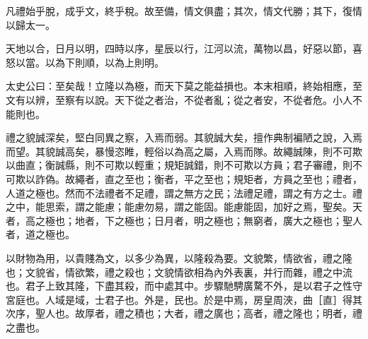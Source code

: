 \begin{pinyinscope}
凡禮始乎脫，成乎文，終乎稅。故至備，情文俱盡；其次，情文代勝；其下，復情以歸太一。

天地以合，日月以明，四時以序，星辰以行，江河以流，萬物以昌，好惡以節，喜怒以當。以為下則順，以為上則明。

太史公曰：至矣哉！立隆以為極，而天下莫之能益損也。本末相順，終始相應，至文有以辨，至察有以說。天下從之者治，不從者亂；從之者安，不從者危。小人不能則也。

禮之貌誠深矣，堅白同異之察，入焉而弱。其貌誠大矣，擅作典制褊陋之說，入焉而望。其貌誠高矣，暴慢恣睢，輕俗以為高之屬，入焉而隊。故繩誠陳，則不可欺以曲直；衡誠縣，則不可欺以輕重；規矩誠錯，則不可欺以方員；君子審禮，則不可欺以詐偽。故繩者，直之至也；衡者，平之至也；規矩者，方員之至也；禮者，人道之極也。然而不法禮者不足禮，謂之無方之民；法禮足禮，謂之有方之士。禮之中，能思索，謂之能慮；能慮勿易，謂之能固。能慮能固，加好之焉，聖矣。天者，高之極也；地者，下之極也；日月者，明之極也；無窮者，廣大之極也；聖人者，道之極也。

以財物為用，以貴賤為文，以多少為異，以隆殺為要。文貌繁，情欲省，禮之隆也；文貌省，情欲繁，禮之殺也；文貌情欲相為內外表裏，并行而雜，禮之中流也。君子上致其隆，下盡其殺，而中處其中。步驟馳騁廣騖不外，是以君子之性守宮庭也。人域是域，士君子也。外是，民也。於是中焉，房皇周浹，曲［直］得其次序，聖人也。故厚者，禮之積也；大者，禮之廣也；高者，禮之隆也；明者，禮之盡也。


\end{pinyinscope}
